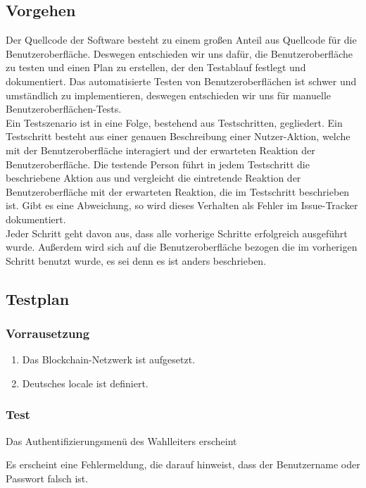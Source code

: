 \documentclass[parskip=full]{scrartcl}
\begin{document}
\subsection{Vorgehen}
Der Quellcode der Software besteht zu einem großen Anteil aus Quellcode für die Benutzeroberfläche. Deswegen entschieden wir uns dafür, die Benutzeroberfläche zu testen und einen Plan zu erstellen, der den Testablauf festlegt und dokumentiert. Das automatisierte Testen von Benutzeroberflächen ist schwer und umständlich zu implementieren, deswegen entschieden wir uns für manuelle Benutzeroberflächen-Tests.
\\
Ein Testszenario ist in eine Folge, bestehend aus Testschritten, gegliedert. Ein Testschritt besteht aus einer genauen Beschreibung einer Nutzer-Aktion, welche mit der Benutzeroberfläche interagiert und der erwarteten Reaktion der Benutzeroberfläche. Die testende Person führt in jedem Testschritt die beschriebene Aktion aus und vergleicht die eintretende Reaktion der Benutzeroberfläche mit der erwarteten Reaktion, die im Testschritt beschrieben ist. Gibt es eine Abweichung, so wird dieses Verhalten als Fehler im Issue-Tracker dokumentiert.
\\
Jeder Schritt geht davon aus, dass alle vorherige Schritte erfolgreich ausgeführt wurde. Außerdem wird sich auf die Benutzeroberfläche bezogen die im vorherigen Schritt benutzt wurde, es sei denn es ist anders beschrieben.

\subsection{Testplan}
\subsubsection{Vorrausetzung}
\begin{enumerate}
		\item Das Blockchain-Netzwerk ist aufgesetzt.
		\item Deutsches locale ist definiert.
\end{enumerate}

\subsubsection{Test}
		{Das Authentifizierungsmenü des Wahlleiters erscheint}

		{Es erscheint eine Fehlermeldung, die darauf hinweist, dass der Benutzername oder Passwort falsch ist.}
\end{document}
